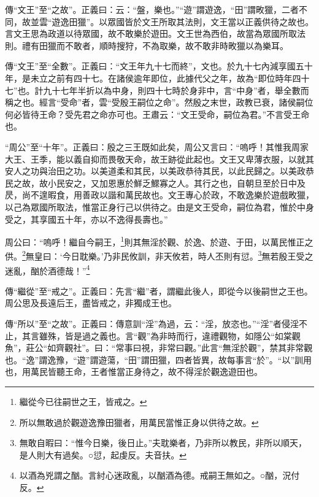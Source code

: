 {\noindent\zhuan{}\fzbyks 傳“文王”至“之故”。正義曰：云：“盤，樂也。”“遊”謂遊逸，“田”謂畋獵，二者不同，故並雲“遊逸田獵”。以眾國皆於文王所取其法則，文王當以正義供待之故也。言文王思為政道以待眾國，故不敢樂於遊田。文王世為西伯，故當為眾國所取法則。禮有田獵而不敢者，順時搜狩，不為取樂，故不敢非時畋獵以為樂耳。 \par}

{\noindent\zhuan{}\fzbyks 傳“文王”至“全數”。正義曰：“文王年九十七而終”，文也。於九十七內減享國五十年，是未立之前有四十七。在諸侯逾年即位，此據代父之年，故為“即位時年四十七”也。計九十七年半折以為中身，則四十七時於身非中，言“中身”者，舉全數而稱之也。經言“受命”者，雲“受殷王嗣位之命”。然殷之末世，政教已衰，諸侯嗣位何必皆待王命？受先君之命亦可也。王肅云：“文王受命，嗣位為君。”不言受王命也。 \par}

{\noindent\shu{}\fzkt “周公”至“十年”。正義曰：殷之三王既如此矣，周公又言曰：“嗚呼！其惟我周家大王、王季，能以義自抑而畏敬天命，故王跡從此起也。文王又卑薄衣服，以就其安人之功與治田之功。以美道柔和其民，以美政恭待其民，以此民歸之。以美政恭民之故，故小民安之，又加恩惠於鮮乏鰥寡之人。其行之也，自朝旦至於日中及昃，尚不遑暇食，用善政以諧和萬民故也。文王專心於政，不敢逸樂於遊戲畋獵，以己為眾國所取法，惟當正身行己以供待之。由是文王受命，嗣位為君，惟於中身受之，其享國五十年，亦以不逸得長壽也。” \par}

周公曰：“嗚呼！繼自今嗣王，\footnote{繼從今已往嗣世之王，皆戒之。}則其無淫於觀、於逸、於遊、于田，以萬民惟正之供。\footnote{所以無敢過於觀遊逸豫田獵者，用萬民當惟正身以供待之故。}無皇曰：‘今日耽樂。’乃非民攸訓，非天攸若，時人丕則有愆。\footnote{無敢自暇曰：“惟今日樂，後日止。”夫耽樂者，乃非所以教民，非所以順天，是人則大有過矣。○愆，起虔反。夫音扶。}無若殷王受之迷亂，酗於酒德哉！”\footnote{以酒為兇謂之酗。言紂心迷政亂，以酗酒為德。戒嗣王無如之。○酗，況付反。}


{\noindent\zhuan{}\fzbyks 傳“繼從”至“戒之”。正義曰：先言“繼”者，謂繼此後人，即從今以後嗣世之王也。周公思及長遠后王，盡皆戒之，非獨成王也。 \par}

{\noindent\zhuan{}\fzbyks 傳“所以”至“之故”。正義曰：傳意訓“淫”為過，云：“淫，放恣也。”“淫”者侵淫不止，其言雖殊，皆是過之義也。言“觀”為非時而行，違禮觀物，如隱公“如棠觀魚”，莊公“如齊觀社”。曰：“常事曰視，非常曰觀。”此言“無淫於觀”，禁其非常觀也。“逸”謂逸豫，“遊”謂遊蕩，“田”謂田獵，四者皆異，故每事言“於”。“以”訓用也，用萬民皆聽王命，王者惟當正身待之，故不得淫於觀逸遊田也。 \par}

